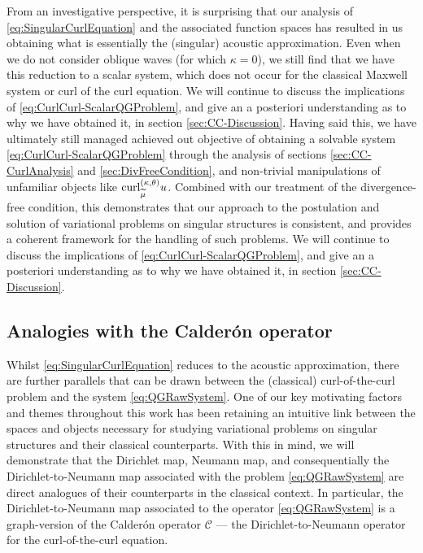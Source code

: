 From an investigative perspective, it is surprising that our analysis of \eqref{eq:SingularCurlEquation} and the associated function spaces has resulted in us obtaining what is essentially the (singular) acoustic approximation.
Even when we do not consider oblique waves (for which $\kappa=0$), we still find that we have this reduction to a scalar system, which does not occur for the classical Maxwell system or curl of the curl equation.
We will continue to discuss the implications of \eqref{eq:CurlCurl-ScalarQGProblem}, and give an a posteriori understanding as to why we have obtained it, in section \ref{sec:CC-Discussion}.
Having said this, we have ultimately still managed achieved out objective of obtaining a solvable system \eqref{eq:CurlCurl-ScalarQGProblem} through the analysis of sections \ref{sec:CC-CurlAnalysis} and \ref{sec:DivFreeCondition}, and non-trivial manipulations of unfamiliar objects like $\mathrm{curl}_{\widetilde{\mu}}^{\left( \kappa, \theta \right)}u$.
Combined with our treatment of the divergence-free condition, this demonstrates that our approach to the postulation and solution of variational problems on singular structures is consistent, and provides a coherent framework for the handling of such problems.
We will continue to discuss the implications of \eqref{eq:CurlCurl-ScalarQGProblem}, and give an a posteriori understanding as to why we have obtained it, in section \ref{sec:CC-Discussion}.

\subsection{Analogies with the Calder\'on operator} \label{ssec:CalderonOp}
Whilst \eqref{eq:SingularCurlEquation} reduces to the acoustic approximation, there are further parallels that can be drawn between the (classical) curl-of-the-curl problem and the system \eqref{eq:QGRawSystem}.
One of our key motivating factors and themes throughout this work has been retaining an intuitive link between the spaces and objects necessary for studying variational problems on singular structures and their classical counterparts.
With this in mind, we will demonstrate that the Dirichlet map, Neumann map, and consequentially the Dirichlet-to-Neumann map associated with the problem \eqref{eq:QGRawSystem} are direct analogues of their counterparts in the classical context.
In particular, the Dirichlet-to-Neumann map associated to the operator \eqref{eq:QGRawSystem} is a graph-version of the Calder\'{o}n operator $\mathcal{C}$ --- the Dirichlet-to-Neumann operator for the curl-of-the-curl equation.

